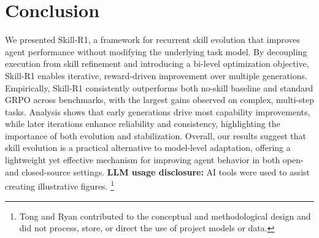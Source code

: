 \section{Conclusion}
\label{sec:conclusion}
We presented Skill-R1, a framework for recurrent skill evolution that improves agent performance without modifying the underlying task model. By decoupling execution from skill refinement and introducing a bi-level optimization objective, Skill-R1 enables iterative, reward-driven improvement over multiple generations. Empirically, Skill-R1 consistently outperforms both no-skill baseline and standard GRPO across benchmarks, with the largest gains observed on complex, multi-step tasks. Analysis shows that early generations drive most capability improvements, while later iterations enhance reliability and consistency, highlighting the importance of both evolution and stabilization. Overall, our results suggest that skill evolution is a practical alternative to model-level adaptation, offering a lightweight yet effective mechanism for improving agent behavior in both open- and closed-source settings.
\textbf{LLM usage disclosure:} AI tools were used to assist creating illustrative figures. 
\footnote{Tong and Ryan contributed to the conceptual and methodological design and did not process, store, or direct the use of project models or data.}